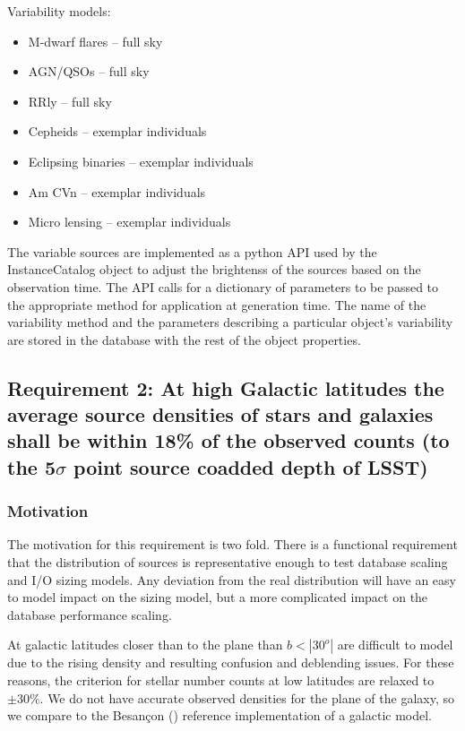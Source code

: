 \documentclass[]{article}
\begin{document}
Variability models:
\begin{itemize}
\item M-dwarf flares -- full sky
\item AGN/QSOs -- full sky
\item RRly -- full sky
\item Cepheids -- exemplar individuals
\item Eclipsing binaries -- exemplar individuals
\item Am CVn -- exemplar individuals
\item Micro lensing -- exemplar individuals
\end{itemize}

The variable sources are implemented as a python API used by the InstanceCatalog object to adjust the brightenss of the sources based on the observation time.
The API calls for a dictionary of parameters to be passed to the appropriate method for application at generation time.  The name of the variability method and
the parameters describing a particular object's variability are stored in the database with the rest of the object properties.

\subsection{Requirement 2: At high Galactic latitudes the average source densities of stars and galaxies
shall be within 18\% of the observed counts (to the 5$\sigma$ point source coadded depth of LSST)}
\subsubsection{Motivation}
The motivation for this requirement is two fold.  There is a functional requirement that the distribution of sources is representative
enough to test database scaling and I/O sizing models.  Any deviation from the real distribution will have an easy to model impact 
on the sizing model, but a more complicated impact on the database performance scaling. 

At galactic latitudes closer than to the plane than $b < |30^o|$ are difficult to model due to the rising density and resulting confusion and deblending issues.
For these reasons, the criterion for stellar number counts at low latitudes are relaxed to $\pm 30\%$.  We do not have accurate observed densities for the plane 
of the galaxy, so we compare to the Besan\c{c}on (\cite{besancon}) reference implementation of a galactic model.
\end{document}
